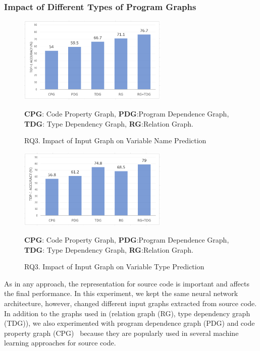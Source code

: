 \subsubsection{Impact of Different Types of Program Graphs}
\label{sec:graphs}

\begin{figure}[thbp]
\begin{center}
\includegraphics[width=2.8in]{figures/sensi-graphs-name}
\vspace{-8pt}
\caption{RQ3. Impact of Input Graph on Variable Name Prediction}
\label{graph-name-result}
{\bf CPG}: Code Property Graph, {\bf PDG}:Program Dependence Graph, {\bf TDG}: Type Dependency Graph, {\bf RG}:Relation Graph. 
\end{center}
\end{figure}

\begin{figure}[thbp]
\begin{center}
\includegraphics[width=2.8in]{figures/sensi-graphs-type}
\vspace{-8pt}
\caption{RQ3. Impact of Input Graph on Variable Type Prediction}
\label{graph-type-result}
{\bf CPG}: Code Property Graph, {\bf PDG}:Program Dependence Graph, {\bf TDG}: Type Dependency Graph, {\bf RG}:Relation Graph.
\end{center}
\end{figure}

As in any approach, the representation for source code is important
and affects the final performance. In this experiment, we kept the
same neural network architecture, however, changed different input
graphs extracted from source code. In addition to the graphs used in
{\tool} (relation graph (RG), type dependency graph (TDG)), we also
experimented with program dependence graph (PDG) and code property
graph (CPG)~\cite{CPG-2014} because they are popularly used in several
machine learning approaches for source code.

